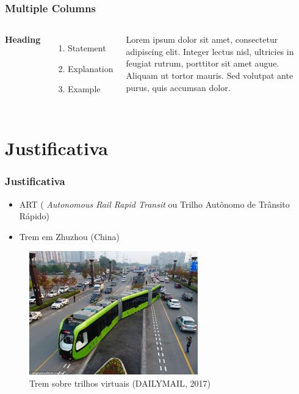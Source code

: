 
\begin{frame}
\frametitle{Multiple Columns}
\begin{columns}[c] %

\textbf{Heading}
\begin{enumerate}
\item Statement
\item Explanation
\item Example
\end{enumerate}

Lorem ipsum dolor sit amet, consectetur adipiscing elit. Integer lectus nisl, ultricies in feugiat rutrum, porttitor sit amet augue. Aliquam ut tortor mauris. Sed volutpat ante purus, quis accumsan dolor.

\end{columns}
\end{frame}

\section{Justificativa}



\begin{frame}
\frametitle{Justificativa}

\begin{itemize}
\item ART (\textit{ Autonomous Rail Rapid Transit} ou Trilho Autônomo de Trânsito Rápido)
\item Trem em Zhuzhou (China)
\end{itemize}

\begin{figure}[]
 \centering
 \captionsetup{width=0.65\textwidth,font=footnotesize,textfont=bf}
 \includegraphics[width=0.65\textwidth,keepaspectratio]{Figuras/Trem.jpg}
 \caption{Trem sobre trilhos virtuais (DAILYMAIL, 2017)}
\end{figure}


\end{frame}


